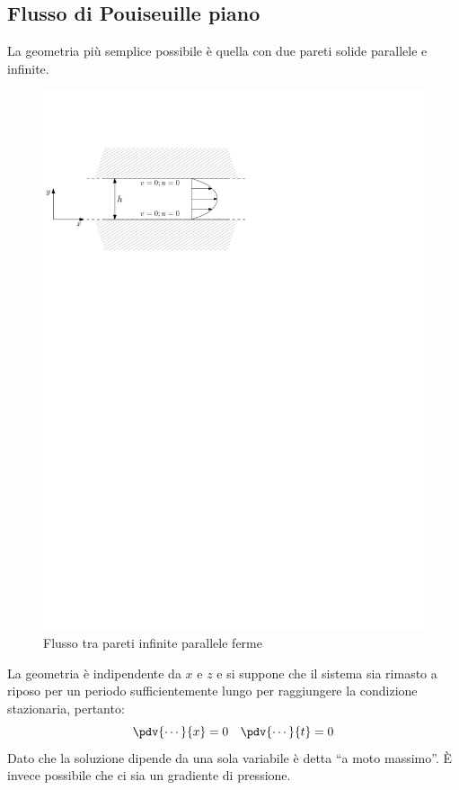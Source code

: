 \subsection{Flusso di Pouiseuille piano}
La geometria più semplice possibile è quella con due pareti solide parallele e infinite.
%
	\begin{figure}[ht]
		\includegraphics[scale=1.0]{./3.6 Soluzioni esatte equazioni di Navier-Stokes/3.6-1}
		\centering
		\caption{Flusso tra pareti infinite parallele ferme}
	\end{figure}
%
La geometria è indipendente da $x$ e $z$ e si suppone che il sistema sia rimasto a riposo per un periodo sufficientemente lungo per raggiungere la condizione stazionaria, pertanto:
%
	\begin{equation*}
		\pdv{\cdots}{x} = 0 \quad \pdv{\cdots}{t} = 0
	\end{equation*}
%
Dato che la soluzione dipende da una sola variabile è detta ``a moto massimo''.
È invece possibile che ci sia un gradiente di pressione.

